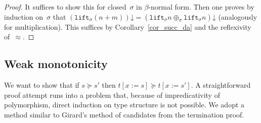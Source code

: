 \documentclass[runningheads,a4paper]{llncs}
\newcommand{\subst}[2]{#1:=#2}
\newcommand{\lift}{\mathtt{lift}}
\newcommand{\da}{\mathord{\downarrow}}
\begin{document}
\begin{proof}
  It suffices to show this for closed~$\sigma$ in $\beta$-normal
  form. Then one proves by induction on~$\sigma$ that
  $(\lift_\sigma(n+m))\da = (\lift_\sigma n \oplus_\sigma \lift_\sigma
  n)\da$ (analogously for multiplication). This suffices by
  Corollary~\ref{cor_succ_da} and the reflexivity of~$\approx$.
\end{proof}

\subsection{Weak monotonicity}\label{sec_weakly_monotone}

We want to show that if $s \succeq s'$ then $t[\subst{x}{s}] \succeq
t[\subst{x}{s'}]$. A straightforward proof attempt runs into a problem
that, because of impredicativity of polymorphism, direct induction on
type structure is not possible. We adopt a method similar to Girard's
method of candidates from the termination proof.
\end{document}
